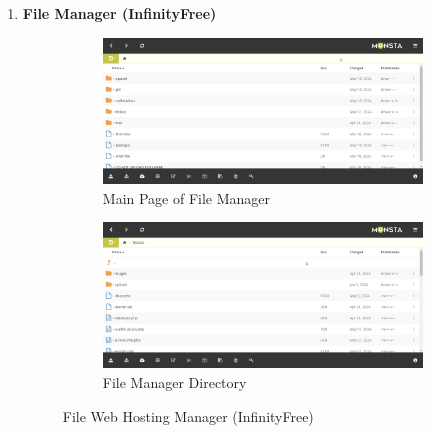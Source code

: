 \begin{enumerate}[1.]
    \item \textbf{File Manager (InfinityFree)}
    \begin{figure}[h]
        \centering
        \begin{subfigure}[b]{1.0\textwidth}
            \centering
            \includegraphics[width=\textwidth]{mainmatter/images/backend/fileman1.png}
            \caption{Main Page of File Manager}
            \vspace{0.8cm}
            \label{fig:sub1}
        \end{subfigure}
        \hspace{0.08\textwidth}
        \begin{subfigure}[b]{1.0\textwidth}
            \centering
            \includegraphics[width=\textwidth]{mainmatter/images/backend/fileman2.png}
            \caption{File Manager Directory}
            \label{fig:sub2}
        \end{subfigure}
        \caption{File Web Hosting Manager (InfinityFree)}
        \label{fig:myfig74a}
    \end{figure}
\end{enumerate}
\clearpage

